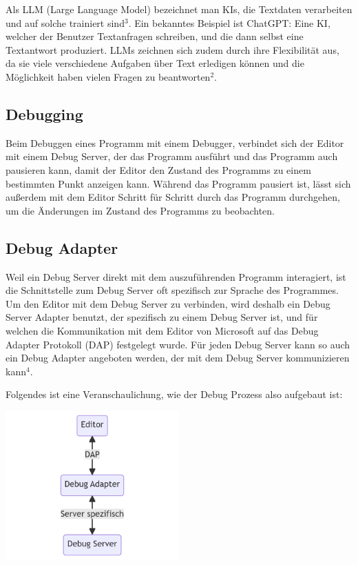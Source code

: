 \documentclass[a4paper,12pt,ngerman]{scrartcl}
\begin{document}
Als LLM (Large Language Model) bezeichnet man KIs, die Textdaten verarbeiten und auf solche trainiert sind$^3$. Ein bekanntes Beispiel ist ChatGPT: Eine KI, welcher der Benutzer Textanfragen schreiben, und die dann selbst eine Textantwort produziert. LLMs zeichnen sich zudem durch ihre Flexibilität aus, da sie viele verschiedene Aufgaben über Text erledigen können und die Möglichkeit haben vielen Fragen zu beantworten$^2$.

\subsection{Debugging}

Beim Debuggen eines Programm mit einem Debugger, verbindet sich der Editor mit einem Debug Server, der das Programm ausführt und das Programm auch pausieren kann, damit der Editor den Zustand des Programms zu einem bestimmten Punkt anzeigen kann. Während das Programm pausiert ist, lässt sich außerdem mit dem Editor Schritt für Schritt durch das Programm durchgehen, um die Änderungen im Zustand des Programms zu beobachten.

\subsection{Debug Adapter}

Weil ein Debug Server direkt mit dem auszuführenden Programm interagiert, ist die Schnittstelle zum Debug Server oft spezifisch zur Sprache des Programmes. Um den Editor mit dem Debug Server zu verbinden, wird deshalb ein Debug Server Adapter benutzt, der spezifisch zu einem Debug Server ist, und für welchen die Kommunikation mit dem Editor von Microsoft auf das Debug Adapter Protokoll (DAP) festgelegt wurde. Für jeden Debug Server kann so auch ein Debug Adapter angeboten werden, der mit dem Debug Server kommunizieren kann$^4$.

Folgendes ist eine Veranschaulichung, wie der Debug Prozess also aufgebaut ist:

\begin{center}
	\includegraphics[width=0.5\textwidth]{debugger}
\end{center}
\end{document}

